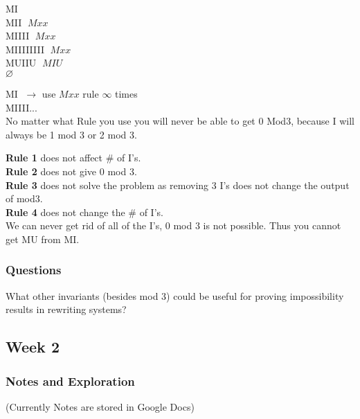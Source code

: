 \documentclass{article}
\theoremstyle{theorem}
\theoremstyle{definition}
\theoremstyle{remark}
\begin{document}
MI \\
MII $\; Mxx$ \\
MIIII $\; Mxx$ \\
MIIIIIIII $\; Mxx$ \\
MUIIU $\; MIU$ \\
$\varnothing$

\vspace{1em}

MI $\; \rightarrow$ use $Mxx$ rule $\infty$ times \\
MIIII... \\

No matter what Rule you use you will never be able to get 0 Mod3, because I will always be 1 mod 3 or 2 mod 3.

\vspace{1em}

\textbf{Rule 1} does not affect \# of I's. \\
\textbf{Rule 2} does not give 0 mod 3. \\
\textbf{Rule 3} does not solve the problem as removing 3 I's does not change the output of mod3. \\
\textbf{Rule 4} does not change the \# of I's. \\

We can never get rid of all of the I's, 0 mod 3 is not possible. Thus you cannot get MU from MI.

\subsubsection{Questions}
What other invariants (besides mod 3) could be useful for proving impossibility results in rewriting systems?

\subsection{Week 2}

\subsubsection{Notes and Exploration}
(Currently Notes are stored in Google Docs)
\end{document}
